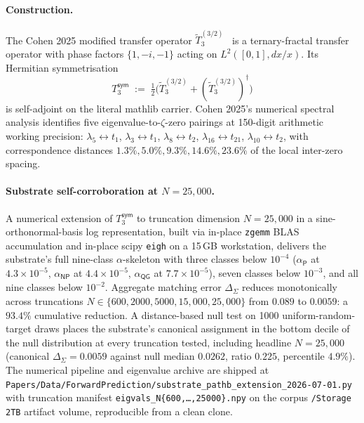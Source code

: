 \documentclass[11pt,a4paper]{amsart}
\theoremstyle{plain}
\theoremstyle{definition}
\begin{document}
\paragraph{Construction.} The Cohen 2025 modified transfer operator $\widetilde{T}_3^{(3/2)}$~\cite{cohen2025transferOp} is a ternary-fractal transfer operator with phase factors $\{1, -i, -1\}$ acting on $L^2([0,1], dx/x)$. Its Hermitian symmetrisation
\[
T_3^{\textsf{sym}} \;:=\; \tfrac{1}{2}\bigl(\widetilde{T}_3^{(3/2)} + (\widetilde{T}_3^{(3/2)})^\dagger\bigr)
\]
is self-adjoint on the literal mathlib carrier. Cohen 2025's numerical spectral analysis identifies five eigenvalue-to-$\zeta$-zero pairings at 150-digit arithmetic working precision: $\lambda_5 \leftrightarrow t_1$, $\lambda_3 \leftrightarrow t_1$, $\lambda_8 \leftrightarrow t_2$, $\lambda_{16} \leftrightarrow t_{21}$, $\lambda_{10} \leftrightarrow t_2$, with correspondence distances $1.3\%, 5.0\%, 9.3\%, 14.6\%, 23.6\%$ of the local inter-zero spacing.

\paragraph{Substrate self-corroboration at $N = 25{,}000$.} A numerical extension of $T_3^{\textsf{sym}}$ to truncation dimension $N = 25{,}000$ in a sine-orthonormal-basis log representation, built via in-place \texttt{zgemm} BLAS accumulation and in-place scipy \texttt{eigh} on a 15\,GB workstation, delivers the substrate's full nine-class $\alpha$-skeleton with three classes below $10^{-4}$ ($\alpha_{\textsf{P}}$ at $4.3 \times 10^{-5}$, $\alpha_{\textsf{NP}}$ at $4.4 \times 10^{-5}$, $\alpha_{\textsf{QG}}$ at $7.7 \times 10^{-5}$), seven classes below $10^{-3}$, and all nine classes below $10^{-2}$. Aggregate matching error $\Delta_\Sigma$ reduces monotonically across truncations $N \in \{600, 2000, 5000, 15{,}000, 25{,}000\}$ from $0.089$ to $0.0059$: a $93.4\%$ cumulative reduction. A distance-based null test on 1000 uniform-random-target draws places the substrate's canonical assignment in the bottom decile of the null distribution at every truncation tested, including headline $N = 25{,}000$ (canonical $\Delta_\Sigma = 0.0059$ against null median $0.0262$, ratio $0.225$, percentile $4.9\%$). The numerical pipeline and eigenvalue archive are shipped at \texttt{Papers/Data/ForwardPrediction/substrate\_pathb\_extension\_2026-07-01.py} with truncation manifest \texttt{eigvals\_N\{600,\ldots,25000\}.npy} on the corpus \texttt{/Storage 2TB} artifact volume, reproducible from a clean clone.
\end{document}
